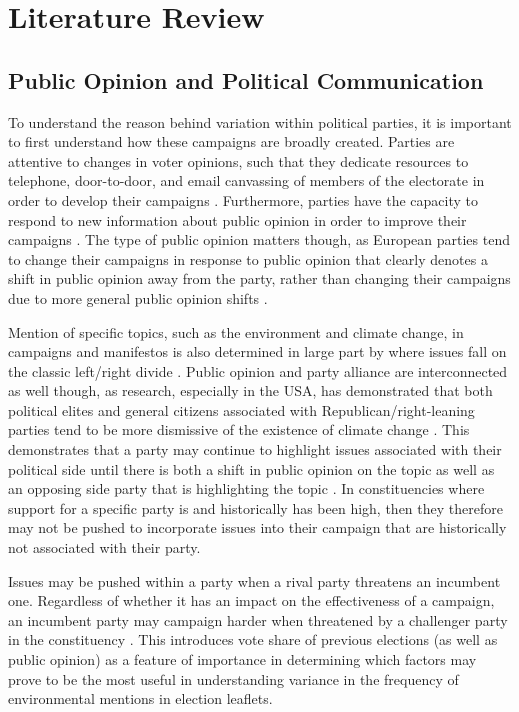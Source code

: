 \documentclass[preprint,12pt,authoryear]{elsarticle}
\begin{document}
\section{Literature Review}

\subsection{Public Opinion and Political Communication}

To understand the reason behind variation within political parties, it is important to first understand how these campaigns are broadly created. Parties are attentive to changes in voter opinions, such that they dedicate resources to telephone, door-to-door, and email canvassing of members of the electorate in order to develop their campaigns \citep{fisherFootsloggingCallCentres2008}. Furthermore, parties have the capacity to respond to new information about public opinion in order to improve their campaigns \citep{hartmanLearningJobAdapting2017}. The type of public opinion matters though, as European parties tend to change their campaigns in response to public opinion that clearly denotes a shift in public opinion away from the party, rather than changing their campaigns due to more general public opinion shifts \citep{adamsUnderstandingChangeStability2004}. 

Mention of specific topics, such as the environment and climate change, in campaigns and manifestos is also determined in large part by where issues fall on the classic left/right divide \citep{farstadWhatExplainsVariation2018}. Public opinion and party alliance are interconnected as well though, as research, especially in the USA, has demonstrated that both political elites and general citizens associated with Republican/right-leaning parties tend to be more dismissive of the existence of climate change  \citep{dunlapPoliticalDivideClimate2016,mccrightPoliticizationClimateChange2011}. This demonstrates that a party may continue to highlight issues associated with their political side until there is both a shift in public opinion on the topic as well as an opposing side party that is highlighting the topic \citep{carterPartyPoliticizationEnvironment2006}. In constituencies where support for a specific party is and historically has been high, then they therefore may not be pushed to incorporate issues into their campaign that are historically not associated with their party. 

Issues may be pushed within a party when a rival party threatens an incumbent one. Regardless of whether it has an impact on the effectiveness of a campaign, an incumbent party may campaign harder when threatened by a challenger party in the constituency \citep{pattieIncumbentPartiesIncumbent2017a}. This introduces vote share of previous elections (as well as public opinion) as a feature of importance in determining which factors may prove to be the most useful in understanding variance in the frequency of environmental mentions in election leaflets.
\end{document}
